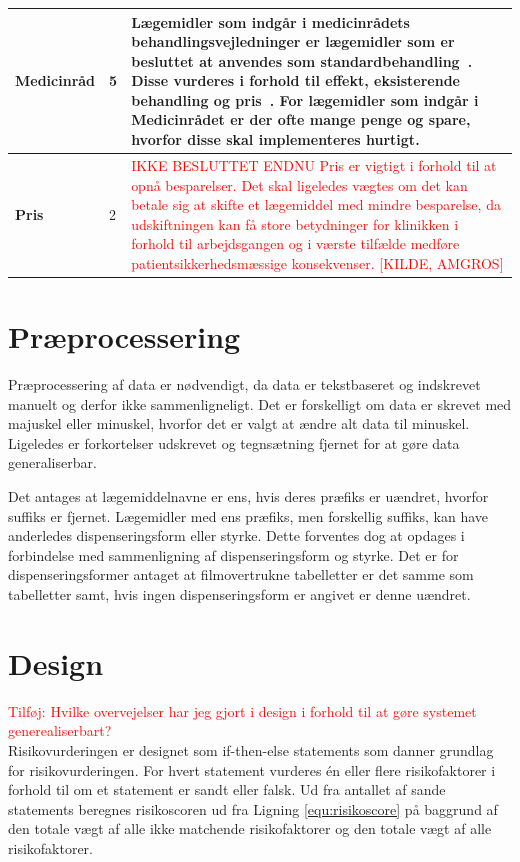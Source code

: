 \begin{longtable}{p{3.5cm}| p{1.0cm} | p{9.2cm}}
 \\ \hline 
\textbf{Medicinråd} & 5 & Lægemidler som indgår i medicinrådets behandlingsvejledninger er lægemidler som er besluttet at anvendes som standardbehandling~\citep{Medicinradet2018}. Disse vurderes i forhold til effekt, eksisterende behandling og pris~\citep{Medicinradet2018}. For lægemidler som indgår i Medicinrådet er der ofte mange penge og spare, hvorfor disse skal implementeres hurtigt. \\ \hline 
\textbf{Pris} &  2 & \textcolor{red}{ IKKE BESLUTTET ENDNU Pris er vigtigt i forhold til at opnå besparelser. Det skal ligeledes vægtes om det kan betale sig at skifte et lægemiddel med mindre besparelse, da udskiftningen kan få store betydninger for klinikken i forhold til arbejdsgangen og i værste tilfælde medføre patientsikkerhedsmæssige konsekvenser. [KILDE, AMGROS]} \\ \hline
    \end{longtable}

\section{Præprocessering}
Præprocessering af data er nødvendigt, da data er tekstbaseret og indskrevet manuelt og derfor ikke sammenligneligt. Det er forskelligt om data er skrevet med majuskel eller minuskel, hvorfor det er valgt at ændre alt data til minuskel. Ligeledes er forkortelser udskrevet og tegnsætning fjernet for at gøre data generaliserbar. 

Det antages at lægemiddelnavne er ens, hvis deres præfiks er uændret, hvorfor suffiks er fjernet. Lægemidler med ens præfiks, men forskellig suffiks, kan have anderledes dispenseringsform eller styrke. Dette forventes dog at opdages i forbindelse med sammenligning af dispenseringsform og styrke. Det er for dispenseringsformer antaget at filmovertrukne tabelletter er det samme som tabelletter samt, hvis ingen dispenseringsform er angivet er denne uændret.

\section{Design}
\textcolor{red}{Tilføj: Hvilke overvejelser har jeg gjort i design i forhold til at gøre systemet generealiserbart?} \\
Risikovurderingen er designet som if-then-else statements som danner grundlag for risikovurderingen. For hvert statement vurderes én eller flere risikofaktorer i forhold til om et statement er sandt eller falsk. Ud fra antallet af sande statements beregnes risikoscoren ud fra Ligning \ref{equ:risikoscore} på baggrund af den totale vægt af alle ikke matchende risikofaktorer og den totale vægt af alle risikofaktorer.

